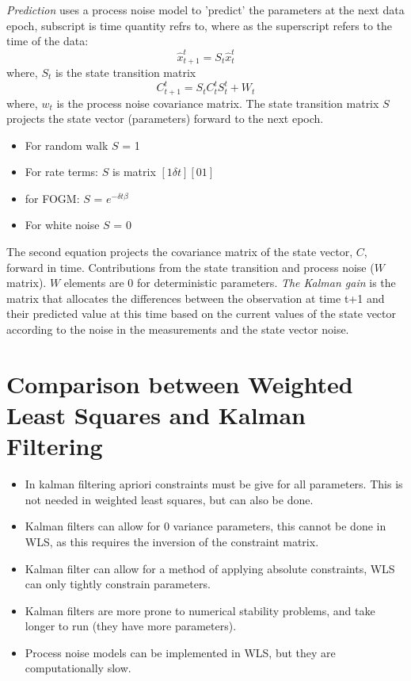 \textit{Prediction} {uses a process noise model} to 'predict' the parameters at the next data epoch, subscript is time quantity refrs to, where as the superscript refers to the time of the data:
\begin{equation}
    \hat{x}_{t+1}^t = S_t \hat{x}_t^t
\end{equation}
where, $S_t$ is the state transition matrix
\begin{equation}
    C_{t+1}^t = S_t C_t^t S_t^t + W_t
\end{equation}
where, $w_t$ is the process noise covariance matrix.
The state transition matrix $S$ projects the state vector (parameters) forward to the next epoch.
\begin{itemize}
    \item For random walk $S$ = 1
    \item For rate terms: $S$ is matrix $[1 \delta t][0 1]$
    \item for FOGM: $S$ = $e^{-\delta t \beta}$
    \item For white noise $S$ = 0
\end{itemize}
The second equation projects the covariance matrix of the state vector, $C$, forward in time. Contributions from the state transition and process noise ($W$ matrix). $W$ elements are 0 for deterministic parameters.
%
\textit{The Kalman gain} {is the matrix} that allocates the differences between the observation at time t+1 and their predicted value at this time based on the current values of the state vector according to the noise in the measurements and the state vector noise.

\section{Comparison between Weighted Least Squares and Kalman Filtering}

\begin{itemize}
    \item In kalman filtering apriori constraints must be give for all parameters. This is not needed in weighted least squares, but can also be done.
    \item Kalman filters can allow for 0 variance parameters, this cannot be done in WLS, as this requires the inversion of the constraint matrix.
    \item Kalman filter can allow for a method of applying absolute constraints, WLS can only tightly constrain parameters.
    \item Kalman filters are more prone to numerical stability problems, and take longer to run (they have more parameters).
    \item Process noise models can be implemented in WLS, but they are computationally slow.
\end{itemize}

